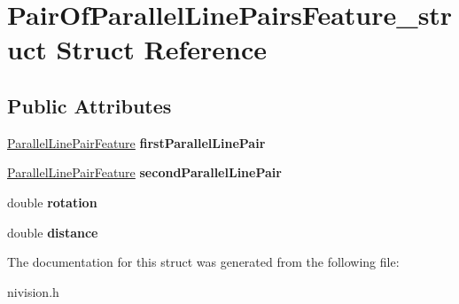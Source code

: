 \hypertarget{structPairOfParallelLinePairsFeature__struct}{
\section{PairOfParallelLinePairsFeature\_\-struct Struct Reference}
\label{structPairOfParallelLinePairsFeature__struct}
}
\subsection*{Public Attributes}
\begin{DoxyCompactItemize}
\item 
\hypertarget{structPairOfParallelLinePairsFeature__struct_a8de3489de85240bc9edca9d2de602377}{
\hyperlink{structParallelLinePairFeature__struct}{ParallelLinePairFeature} {\bfseries firstParallelLinePair}}
\label{structPairOfParallelLinePairsFeature__struct_a8de3489de85240bc9edca9d2de602377}

\item 
\hypertarget{structPairOfParallelLinePairsFeature__struct_a06bf51a3852e8c43c967d9328268cb9f}{
\hyperlink{structParallelLinePairFeature__struct}{ParallelLinePairFeature} {\bfseries secondParallelLinePair}}
\label{structPairOfParallelLinePairsFeature__struct_a06bf51a3852e8c43c967d9328268cb9f}

\item 
\hypertarget{structPairOfParallelLinePairsFeature__struct_a15b59451100dacb13718ef12cae6fa03}{
double {\bfseries rotation}}
\label{structPairOfParallelLinePairsFeature__struct_a15b59451100dacb13718ef12cae6fa03}

\item 
\hypertarget{structPairOfParallelLinePairsFeature__struct_ab134c15286b4682a9a4fea6299466371}{
double {\bfseries distance}}
\label{structPairOfParallelLinePairsFeature__struct_ab134c15286b4682a9a4fea6299466371}

\end{DoxyCompactItemize}


The documentation for this struct was generated from the following file:\begin{DoxyCompactItemize}
\item 
nivision.h\end{DoxyCompactItemize}
